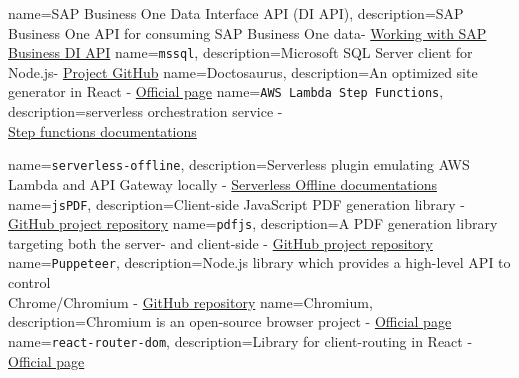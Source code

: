 {
        name=SAP Business One Data Interface API (DI API),
        description={SAP Business One API for consuming SAP Business One data-  \href{https://help.sap.com/doc/saphelpiis_hc_b1_image_repository_development_training_basic_b1_90_tb1300_02_sol_pdf/9.0/en-US/B1_90_TB1300_02_Sol.pdf}{Working with SAP Business DI API}}
}
{
        name=\texttt{mssql},
        description={Microsoft SQL Server client for Node.js-  \href{https://github.com/tediousjs/node-mssql}{Project GitHub}}
}
{
        name=Doctosaurus,
        description={An optimized site generator in React -  \href{https://docusaurus.io/}{Official page}}
}
{
        name=\texttt{AWS Lambda Step Functions},
        description={serverless orchestration service -\\ \href{https://docs.aws.amazon.com/step-functions/latest/dg/welcome.html}{Step functions documentations}}
}

{
        name=\texttt{serverless-offline},
        description={Serverless plugin emulating AWS Lambda and API Gateway locally  - \href{https://www.serverless.com/plugins/serverless-offline}{Serverless Offline documentations}}
}
{
        name=\texttt{jsPDF},
        description={Client-side JavaScript PDF generation library  - \href{https://github.com/parallax/jsPDF}{GitHub project repository}}
}
{
        name=\texttt{pdfjs},
        description={A PDF generation library targeting both the server- and client-side - \href{https://github.com/rkusa/pdfjs?tab=readme-ov-file}{GitHub project repository}}
}
{
        name=\texttt{Puppeteer},
        description={Node.js library which provides a high-level API to control \\Chrome/Chromium - \href{https://github.com/puppeteer/puppeteer}{GitHub repository}}
}
{
        name=Chromium,
        description={Chromium is an open-source browser project - \href{https://www.chromium.org/chromium-projects/}{Official page}}
}
{
        name=\texttt{react-router-dom},
        description={Library for client-routing in React - \href{https://reactrouter.com/en/main}{Official page}}
}